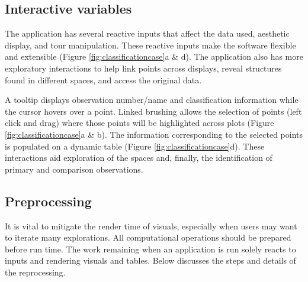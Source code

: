 \documentclass[
]{jss}
\begin{document}
\hypertarget{interactive-variables}{%
\subsection{Interactive variables}\label{interactive-variables}}

The application has several reactive inputs that affect the data used, aesthetic display, and tour manipulation. These reactive inputs make the software flexible and extensible (Figure \ref{fig:classificationcase}a \& d). The application also has more exploratory interactions to help link points across displays, reveal structures found in different spaces, and access the original data.

A tooltip displays observation number/name and classification information while the cursor hovers over a point. Linked brushing allows the selection of points (left click and drag) where those points will be highlighted across plots (Figure \ref{fig:classificationcase}a \& b). The information corresponding to the selected points is populated on a dynamic table (Figure \ref{fig:classificationcase}d). These interactions aid exploration of the spaces and, finally, the identification of primary and comparison observations.

\hypertarget{preprocessing}{%
\subsection{Preprocessing}\label{preprocessing}}

It is vital to mitigate the render time of visuals, especially when users may want to iterate many explorations. All computational operations should be prepared before run time. The work remaining when an application is run solely reacts to inputs and rendering visuals and tables. Below discusses the steps and details of the reprocessing.
\end{document}
